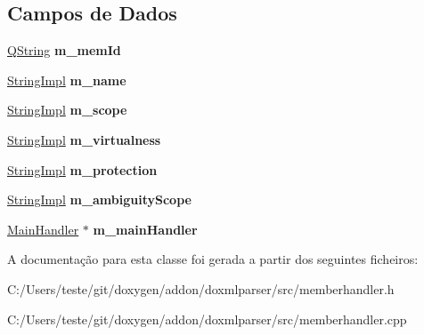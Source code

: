 \subsection*{Campos de Dados}
\begin{DoxyCompactItemize}
\item 
\hypertarget{class_member_reference_a4062ed590f1d018556a6f767bf12e81f}{\hyperlink{class_q_string}{Q\-String} {\bfseries m\-\_\-mem\-Id}}\label{class_member_reference_a4062ed590f1d018556a6f767bf12e81f}

\item 
\hypertarget{class_member_reference_afdcb07277fce2648f1930b0e4e52f123}{\hyperlink{class_string_impl}{String\-Impl} {\bfseries m\-\_\-name}}\label{class_member_reference_afdcb07277fce2648f1930b0e4e52f123}

\item 
\hypertarget{class_member_reference_a1ba348c66c88dcb063ce0686588d9d39}{\hyperlink{class_string_impl}{String\-Impl} {\bfseries m\-\_\-scope}}\label{class_member_reference_a1ba348c66c88dcb063ce0686588d9d39}

\item 
\hypertarget{class_member_reference_a68c5ec3c42f5c8a38781ceb50b154dda}{\hyperlink{class_string_impl}{String\-Impl} {\bfseries m\-\_\-virtualness}}\label{class_member_reference_a68c5ec3c42f5c8a38781ceb50b154dda}

\item 
\hypertarget{class_member_reference_ac11b17c91672571eabab54aaa46c6b6b}{\hyperlink{class_string_impl}{String\-Impl} {\bfseries m\-\_\-protection}}\label{class_member_reference_ac11b17c91672571eabab54aaa46c6b6b}

\item 
\hypertarget{class_member_reference_ad7dc23ba9b51b7a2d2e471853ab00362}{\hyperlink{class_string_impl}{String\-Impl} {\bfseries m\-\_\-ambiguity\-Scope}}\label{class_member_reference_ad7dc23ba9b51b7a2d2e471853ab00362}

\item 
\hypertarget{class_member_reference_adcec7e13ff02e96d2b73b0fa7ae61dd2}{\hyperlink{class_main_handler}{Main\-Handler} $\ast$ {\bfseries m\-\_\-main\-Handler}}\label{class_member_reference_adcec7e13ff02e96d2b73b0fa7ae61dd2}

\end{DoxyCompactItemize}


A documentação para esta classe foi gerada a partir dos seguintes ficheiros\-:\begin{DoxyCompactItemize}
\item 
C\-:/\-Users/teste/git/doxygen/addon/doxmlparser/src/memberhandler.\-h\item 
C\-:/\-Users/teste/git/doxygen/addon/doxmlparser/src/memberhandler.\-cpp\end{DoxyCompactItemize}
